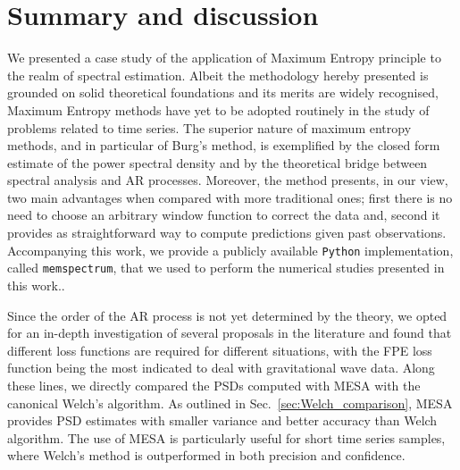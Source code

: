 \documentclass{aa}
\begin{document}
\section{Summary and discussion} \label{sec:conclusion}

We presented a case study of the application of Maximum Entropy principle to the realm of spectral estimation. Albeit the methodology hereby presented is grounded on solid theoretical foundations and its merits are widely recognised, Maximum Entropy methods have yet to be adopted routinely in the study of problems related to time series. The superior nature of maximum entropy methods, and in particular of Burg's method, is exemplified by the closed form estimate of the power spectral density and by the theoretical bridge between spectral analysis and AR processes. Moreover, the method presents, in our view, two main advantages when compared with more traditional ones; first there is no need to choose an arbitrary window function to correct the data and, second it provides as straightforward way to compute predictions given past observations. Accompanying this work, we provide a publicly available \texttt{Python} implementation, called \texttt{memspectrum}, that we used to perform the numerical studies presented in this work.. 

Since the order of the AR process is not yet determined by the theory, we opted for an in-depth investigation of several proposals in the literature and found that different loss functions are required for different situations, with the FPE loss function being the most indicated to deal with gravitational wave data. Along these lines, we directly compared the PSDs computed with MESA with the canonical Welch's algorithm. As outlined in Sec.~\ref{sec:Welch_comparison}, MESA provides PSD estimates with smaller variance and better accuracy than Welch algorithm.
The use of MESA is particularly useful for short time series samples, where Welch's method is outperformed in both precision and confidence.
 
\end{document}
